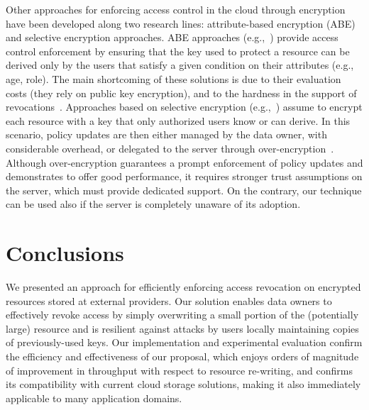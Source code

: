 Other approaches for enforcing access control in the cloud through encryption have been developed along two research lines: attribute-based encryption (ABE) and selective encryption approaches. ABE approaches (e.g.,~\cite{gpsw06,hn11,pbhsr05,ywrl10}) provide access control enforcement by ensuring that the key used to protect a resource can be derived only by the users that satisfy a given condition on their attributes (e.g., age, role). The main shortcoming of these solutions is due to their evaluation costs (they rely on public key encryption), and to the hardness in the support of revocations~\cite{hn11,ywrl10}. Approaches based on selective encryption (e.g.,~\cite{vldb07,tods10,hkd15}) assume to encrypt each resource with a key that only authorized users know or can derive. In this scenario, policy updates are then either managed by the data owner, with considerable overhead, or delegated to the server through over-encryption~\cite{vldb07,tods10}. Although over-encryption guarantees a prompt enforcement of policy updates and demonstrates to offer good performance, it requires stronger trust assumptions on the server, which must provide dedicated support. On the contrary, our technique can be used also if the server is completely unaware of its adoption.


\section{Conclusions}\label{ms:sec:conclu}
We presented an approach for efficiently enforcing access revocation on encrypted resources stored at external providers. Our solution enables data owners to effectively revoke access by simply overwriting a small portion of the (potentially large) resource and is resilient against attacks by users locally maintaining copies of previously-used keys. Our implementation and experimental evaluation confirm the efficiency and effectiveness of our proposal, which enjoys orders of magnitude of improvement in throughput with respect to resource re-writing, and confirms its compatibility with current cloud storage solutions, making it also immediately applicable to many application domains.
